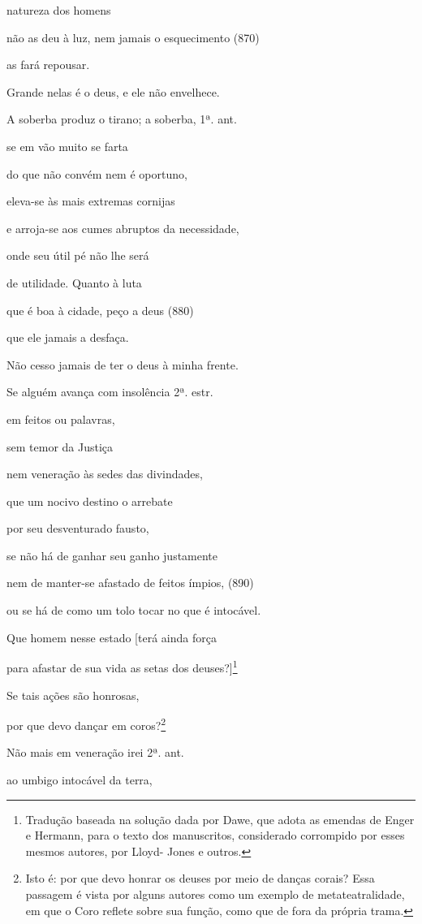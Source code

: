 natureza dos homens

não as deu à luz, nem jamais o esquecimento (870)

as fará repousar.

Grande nelas é o deus, e ele não envelhece.

A soberba produz o tirano; a soberba, 1ª. ant.

se em vão muito se farta

do que não convém nem é oportuno,

eleva-se às mais extremas cornijas

e arroja-se aos cumes abruptos da necessidade,

onde seu útil pé não lhe será

de utilidade. Quanto à luta

que é boa à cidade, peço a deus (880)

que ele jamais a desfaça.

Não cesso jamais de ter o deus à minha frente.

Se alguém avança com insolência 2ª. estr.

em feitos ou palavras,

sem temor da Justiça

nem veneração às sedes das divindades,

que um nocivo destino o arrebate

por seu desventurado fausto,

se não há de ganhar seu ganho justamente

nem de manter-se afastado de feitos ímpios, (890)

ou se há de como um tolo tocar no que é intocável.

Que homem nesse estado {[}terá ainda força

para afastar de sua vida as setas dos deuses?{]}\footnote{Tradução
  baseada na solução dada por Dawe, que adota as emendas de Enger e
  Hermann, para o texto dos manuscritos, considerado corrompido por
  esses mesmos autores, por Lloyd- Jones e outros.}

Se tais ações são honrosas,

por que devo dançar em coros?\footnote{Isto é: por que devo honrar os
  deuses por meio de danças corais? Essa passagem é vista por alguns
  autores como um exemplo de metateatralidade, em que o Coro reflete
  sobre sua função, como que de fora da própria trama.}

Não mais em veneração irei 2ª. ant.

ao umbigo intocável da terra,

